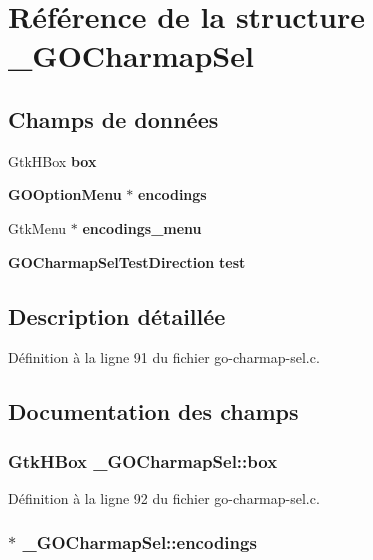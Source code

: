 \section{Référence de la structure \_\-GOCharmapSel}
\label{struct__GOCharmapSel}
\subsection*{Champs de données}
\begin{DoxyCompactItemize}
\item 
GtkHBox {\bf box}
\item 
{\bf GOOptionMenu} $\ast$ {\bf encodings}
\item 
GtkMenu $\ast$ {\bf encodings\_\-menu}
\item 
{\bf GOCharmapSelTestDirection} {\bf test}
\end{DoxyCompactItemize}


\subsection{Description détaillée}


Définition à la ligne 91 du fichier go-\/charmap-\/sel.c.



\subsection{Documentation des champs}
\subsubsection[{box}]{\setlength{\rightskip}{0pt plus 5cm}GtkHBox {\bf \_\-GOCharmapSel::box}}\label{struct__GOCharmapSel_ac12df2bfd1f8b8714a3b4827b8011253}


Définition à la ligne 92 du fichier go-\/charmap-\/sel.c.

\subsubsection[{encodings}]{$\ast$ {\bf \_\-GOCharmapSel::encodings}}\label{struct__GOCharmapSel_ae808b4b1705da8b7e3b75a99f31d5c6c}


